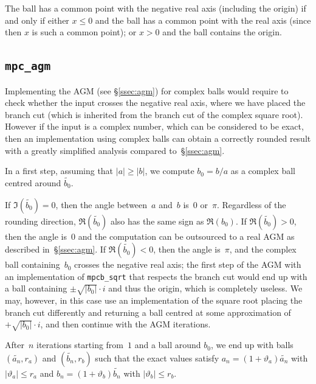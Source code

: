 \documentclass [11pt]{article}
\newcommand {\appro}[1]{\widetilde {#1}}
\renewcommand {\theta}{\vartheta}
\renewcommand {\leq}{\leqslant}
\renewcommand {\geq}{\geqslant}
\begin{document}
The ball has a common point with the negative real axis (including the
origin) if and only if either $x \leq 0$ and the ball has a common point
with the real axis (since then $x$ is such a common point); or $x > 0$
and the ball contains the origin.


\subsection {\texttt {mpc\_agm}}

Implementing the AGM (see \S\ref {ssec:agm}) for complex balls would
require to check whether the input crosses the negative real axis, where
we have placed the branch cut (which is inherited from the branch cut
of the complex square root). However if the input is a complex number,
which can be considered to be exact, then an implementation using complex
balls can obtain a correctly rounded result with a greatly simplified
analysis compared to~\S\ref {ssec:agm}.

In a first step, assuming that $|a| \geq |b|$, we compute
$b_0 = b / a$ as a complex ball centred around $\appro {b_0}$.

If $\Im (\appro {b_0}) = 0$, then the angle between~$a$ and~$b$
is~$0$ or~$\pi$. Regardless of the rounding direction, $\Re (\appro {b_0})$
also has the same sign as $\Re (b_0)$. If $\Re (\appro {b_0}) > 0$,
then the angle is~$0$ and the computation can be outsourced to a real AGM
as described in~\S\ref {ssec:agm}.
If $\Re (\appro {b_0}) < 0$, then the angle is~$\pi$, and the complex ball
containing~$b_0$ crosses the negative real axis; the first step of the AGM
with an implementation of \texttt {mpcb\_sqrt} that respects the branch cut
would end up with a ball containing $\pm \sqrt {|b_0|} \cdot i$ and thus
the origin, which is completely useless. We may, however, in this case use
an implementation of the square root placing the branch cut differently and
returning a ball centred at some approximation of $+ \sqrt {|b_0|} \cdot i$,
and then continue with the AGM iterations.

After~$n$ iterations starting from~$1$ and a ball around $b_0$, we end
up with balls $(\appro {a_n}, r_a)$ and $(\appro {b_n}, r_b)$ such
that the exact values satisfy $a_n = (1 + \theta_a) \appro {a_n}$
with $|\theta_a| \leq r_a$ and $b_n = (1 + \theta_b) \appro {b_n}$
with $|\theta_b| \leq r_b$.
\end{document}
